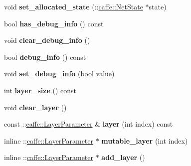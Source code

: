 \begin{DoxyCompactItemize}
void {\bfseries set\+\_\+allocated\+\_\+state} (\+::\mbox{\hyperlink{classcaffe_1_1_net_state}{caffe\+::\+Net\+State}} $\ast$state)
\item 
\mbox{\label{classcaffe_1_1_net_parameter_a455205e09df9bd144592cfc5de5ba1cd}} 
bool {\bfseries has\+\_\+debug\+\_\+info} () const
\item 
\mbox{\label{classcaffe_1_1_net_parameter_adc68870d5c5327b3f522351fd25155c8}} 
void {\bfseries clear\+\_\+debug\+\_\+info} ()
\item 
\mbox{\label{classcaffe_1_1_net_parameter_a871d961e8fd5c66ffd2d0096e531514b}} 
bool {\bfseries debug\+\_\+info} () const
\item 
\mbox{\label{classcaffe_1_1_net_parameter_a863aa795a120330d8c9623034924d699}} 
void {\bfseries set\+\_\+debug\+\_\+info} (bool value)
\item 
\mbox{\label{classcaffe_1_1_net_parameter_a2844a228a98d98a1cc05b01f37488286}} 
int {\bfseries layer\+\_\+size} () const
\item 
\mbox{\label{classcaffe_1_1_net_parameter_a3059f187a93e0378f345a4f5a7920f6e}} 
void {\bfseries clear\+\_\+layer} ()
\item 
\mbox{\label{classcaffe_1_1_net_parameter_a85e81f802819a18cf88c1085b9b63256}} 
const \+::\mbox{\hyperlink{classcaffe_1_1_layer_parameter}{caffe\+::\+Layer\+Parameter}} \& {\bfseries layer} (int index) const
\item 
\mbox{\label{classcaffe_1_1_net_parameter_ab3503ee982fe0cbbbb408430e62c7731}} 
inline \+::\mbox{\hyperlink{classcaffe_1_1_layer_parameter}{caffe\+::\+Layer\+Parameter}} $\ast$ {\bfseries mutable\+\_\+layer} (int index)
\item 
\mbox{\label{classcaffe_1_1_net_parameter_a1d665857a959cce1a27484b3dccfca2e}} 
inline \+::\mbox{\hyperlink{classcaffe_1_1_layer_parameter}{caffe\+::\+Layer\+Parameter}} $\ast$ {\bfseries add\+\_\+layer} ()

\end{DoxyCompactItemize}
